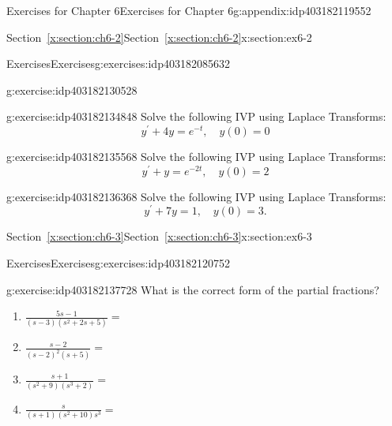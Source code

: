 \documentclass[oneside,10pt,]{book}
\newcommand{\xreffont}{\relax}
\numberwithin{equation}{section}
\numberwithin{equation}{section}
\begin{document}
\begin{appendixptx}{Exercises for Chapter 6}{}{Exercises for Chapter 6}{}{}{g:appendix:idp403182119552}
\begin{sectionptx}{Section~{\xreffont\ref*{x:section:ch6-2}}}{}{Section~{\xreffont\ref*{x:section:ch6-2}}}{}{}{x:section:ex6-2}
\begin{exercises-subsection-numberless}{Exercises}{}{Exercises}{}{}{g:exercises:idp403182085632}
\begin{divisionexercise}{1}{}{}{g:exercise:idp403182130528}
\end{divisionexercise}%
\begin{divisionexercise}{2}{}{}{g:exercise:idp403182134848}%
Solve the following IVP using Laplace Transforms:%
\begin{equation*}
y^{\prime}+4y=e^{-t},\,\,\,\,\,\,y(0)=0
\end{equation*}
%
\end{divisionexercise}%
\begin{divisionexercise}{3}{}{}{g:exercise:idp403182135568}%
Solve the following IVP using Laplace Transforms:%
\begin{equation*}
y^{\prime}+y=e^{-2t},\,\,\,\,\,\,y(0)=2
\end{equation*}
%
\end{divisionexercise}%
\begin{divisionexercise}{4}{}{}{g:exercise:idp403182136368}%
Solve the following IVP using Laplace Transforms:%
\begin{equation*}
y^{\prime}+7y=1,\,\,\,\,\,\,y(0)=3.
\end{equation*}
%
\end{divisionexercise}%
\end{exercises-subsection-numberless}
\end{sectionptx}
%
%
\typeout{************************************************}
\typeout{Section F.3 Section~{\xreffont\ref*{x:section:ch6-3}}}
\typeout{************************************************}
%
\begin{sectionptx}{Section~{\xreffont\ref*{x:section:ch6-3}}}{}{Section~{\xreffont\ref*{x:section:ch6-3}}}{}{}{x:section:ex6-3}
%
%
\typeout{************************************************}
\typeout{************************************************}
%
\begin{exercises-subsection-numberless}{Exercises}{}{Exercises}{}{}{g:exercises:idp403182120752}
\begin{divisionexercise}{1}{}{}{g:exercise:idp403182137728}%
What is the correct form of the partial fractions?%
\begin{enumerate}[label=(\alph*)]
\item{}\(\displaystyle \frac{5s-1}{\left(s-3\right)\left(s^{2}+2s+5\right)}=\)%
\item{}\(\displaystyle \frac{s-2}{\left(s-2\right)^{2}\left(s+5\right)}=\)%
\item{}\(\displaystyle \frac{s+1}{\left(s^{2}+9\right)\left(s^{3}+2\right)}=\)%
\item{}\(\displaystyle \frac{s}{\left(s+1\right)\left(s^{2}+10\right)s^{3}}=\)%

\end{enumerate}
\end{divisionexercise}
\end{exercises-subsection-numberless}
\end{sectionptx}
\end{appendixptx}
\end{document}
